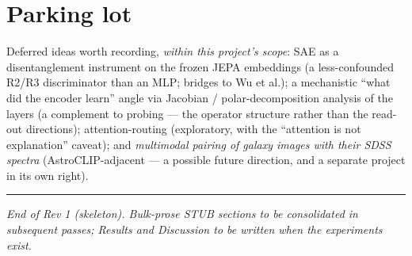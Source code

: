 \documentclass[11pt,a4paper]{article}
\begin{document}
\section{Parking lot}\label{sec:parking}


Deferred ideas worth recording, \emph{within this project's scope}: SAE as a disentanglement
instrument on the frozen JEPA embeddings (a less-confounded R2/R3 discriminator than an MLP;
bridges to Wu et al.); a mechanistic ``what did the encoder learn'' angle via Jacobian /
polar-decomposition analysis of the layers (a complement to probing --- the operator structure
rather than the read-out directions); attention-routing (exploratory, with the ``attention is
not explanation'' caveat); and \emph{multimodal pairing of galaxy images with their SDSS
spectra} (AstroCLIP-adjacent --- a possible future direction, and a separate project in its own
right).

\vfill
\begin{center}\rule{0.4\textwidth}{0.4pt}\end{center}
\begin{center}\small\itshape End of Rev 1 (skeleton). Bulk-prose \textsf{STUB} sections to be
consolidated in subsequent passes; Results and Discussion to be written when the experiments
exist.\end{center}
\end{document}
